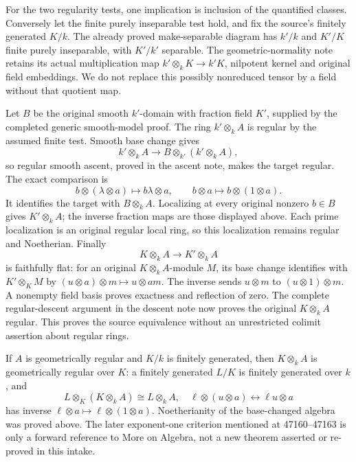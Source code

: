 For the two regularity tests, one implication is inclusion of the quantified classes. Conversely let the finite purely inseparable test hold, and fix the source's finitely generated \(K/k\). The already proved make-separable diagram has \(k'/k\) and \(K'/K\) finite purely inseparable, with \(K'/k'\) separable. The geometric-normality note retains its actual multiplication map \(k'\otimes_kK\to k'K\), nilpotent kernel and original field embeddings. We do not replace this possibly nonreduced tensor by a field without that quotient map.

Let \(B\) be the original smooth \(k'\)-domain with fraction field \(K'\), supplied by the completed generic smooth-model proof. The ring \(k'\otimes_kA\) is regular by the assumed finite test. Smooth base change gives \[
 k'\otimes_kA\longrightarrow B\otimes_{k'}(k'\otimes_kA),
\] so regular smooth ascent, proved in the ascent note, makes the target regular. The exact comparison is \[
 b\otimes(\lambda\otimes a)\longmapsto b\lambda\otimes a,
 \qquad b\otimes a\longmapsto b\otimes(1\otimes a).
\] It identifies the target with \(B\otimes_kA\). Localizing at every original nonzero \(b\in B\) gives \(K'\otimes_kA\); the inverse fraction maps are those displayed above. Each prime localization is an original regular local ring, so this localization remains regular and Noetherian. Finally \[
 K\otimes_kA\longrightarrow K'\otimes_kA
\] is faithfully flat: for an original \(K\otimes_kA\)-module \(M\), its base change identifies with \(K'\otimes_KM\) by \((u\otimes a)\otimes m\mapsto u\otimes am\). The inverse sends \(u\otimes m\) to \((u\otimes1)\otimes m\). A nonempty field basis proves exactness and reflection of zero. The complete regular-descent argument in the descent note now proves the original \(K\otimes_kA\) regular. This proves the source equivalence without an unrestricted colimit assertion about regular rings.

If \(A\) is geometrically regular and \(K/k\) is finitely generated, then \(K\otimes_kA\) is geometrically regular over \(K\): a finitely generated \(L/K\) is finitely generated over \(k\), and \[
 L\otimes_K(K\otimes_kA)\cong L\otimes_kA,
 \quad \ell\otimes(u\otimes a)\longleftrightarrow\ell u\otimes a
\] has inverse \(\ell\otimes a\mapsto\ell\otimes(1\otimes a)\). Noetherianity of the base-changed algebra was proved above. The later exponent-one criterion mentioned at 47160--47163 is only a forward reference to More on Algebra, not a new theorem asserted or re-proved in this intake.

